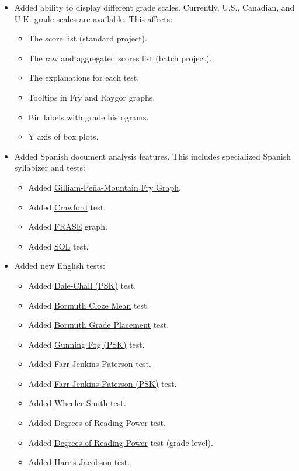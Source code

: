 \documentclass[
]{book}
\providecommand{\tightlist}{%
  \setlength{\itemsep}{0pt}\setlength{\parskip}{0pt}}
\theoremstyle{definition}
\theoremstyle{definition}
\theoremstyle{definition}
\theoremstyle{definition}
\theoremstyle{remark}
\begin{document}
\begin{itemize}
\tightlist
\item
  Added ability to display different grade scales. Currently, U.S., Canadian, and U.K. grade scales are available. This affects:

  \begin{itemize}
  \tightlist
  \item
    The score list (standard project).
  \item
    The raw and aggregated scores list (batch project).
  \item
    The explanations for each test.
  \item
    Tooltips in Fry and Raygor graphs.
  \item
    Bin labels with grade histograms.
  \item
    Y axis of box plots.
  \end{itemize}
\item
  Added Spanish document analysis features. This includes specialized Spanish syllabizer and tests:

  \begin{itemize}
  \tightlist
  \item
    Added \protect\hyperlink{gilliam-pena-mountain-fry-graph}{Gilliam-Peña-Mountain Fry Graph}.
  \item
    Added \protect\hyperlink{crawford}{Crawford} test.
  \item
    Added \protect\hyperlink{frase}{FRASE} graph.
  \item
    Added \protect\hyperlink{sol-spanish}{SOL} test.
  \end{itemize}
\item
  Added new English tests:

  \begin{itemize}
  \tightlist
  \item
    Added \protect\hyperlink{psk-dale-chall}{Dale-Chall (PSK)} test.
  \item
    Added \protect\hyperlink{bormuth-cloze-mean-machine-passage}{Bormuth Cloze Mean} test.
  \item
    Added \protect\hyperlink{bormuth-grade-placement-35-machine-passage}{Bormuth Grade Placement} test.
  \item
    Added \protect\hyperlink{psk-fog}{Gunning Fog (PSK)} test.
  \item
    Added \protect\hyperlink{farr-jenkins-paterson}{Farr-Jenkins-Paterson} test.
  \item
    Added \protect\hyperlink{psk-farr-jenkins-paterson}{Farr-Jenkins-Paterson (PSK)} test.
  \item
    Added \protect\hyperlink{wheeler-smith}{Wheeler-Smith} test.
  \item
    Added \protect\hyperlink{degrees-of-reading-power}{Degrees of Reading Power} test.
  \item
    Added \protect\hyperlink{degrees-of-reading-power-grade-equivalent}{Degrees of Reading Power} test (grade level).
  \item
    Added \protect\hyperlink{harris-jacobson}{Harris-Jacobson} test.


\end{itemize}
\end{itemize}
\end{document}
